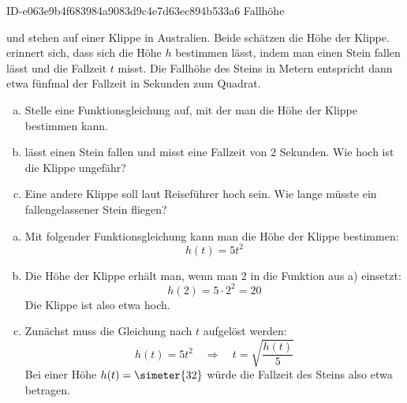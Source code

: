 \begin{exercise}
      {ID-e063e9b4f683984a9083d9c4e7d63ec894b533a6}
      {Fallhöhe}
  \ifproblem\problem\par
    \xya{} und \xyb{} stehen auf einer Klippe in Australien. Beide schätzen
    die Höhe der Klippe. \xya{} erinnert sich, dass sich die Höhe $h$ bestimmen
    lässt, indem man einen Stein fallen lässt und die Fallzeit $t$ misst. Die
    Fallhöhe des Steins in Metern entspricht dann etwa fünfmal der Fallzeit in
    Sekunden zum Quadrat.
    \begin{enumerate}[a)]
      \item Stelle eine Funktionsgleichung auf, mit der man die Höhe der Klippe
            bestimmen kann.
      \item \xya{} lässt einen Stein fallen und \xyb{} misst eine Fallzeit
            von \num{2} Sekunden. Wie hoch ist die Klippe ungefähr?
      \item Eine andere Klippe soll laut Reiseführer  hoch sein.
            Wie lange müsste ein fallengelassener Stein fliegen?
    \end{enumerate}
  \fi
  \ifoutcome\outcome\par
    \begin{enumerate}[a)]
      \item Mit folgender Funktionsgleichung kann man die Höhe der Klippe
            bestimmen:
            \begin{equation*}
              h(t)=5t^2
            \end{equation*}
      \item Die Höhe der Klippe erhält man, wenn man \num{2} in die Funktion aus a)
            einsetzt:
            \begin{equation*}
              h(\num{2})=5\cdot\num{2}^2=\num{20}
            \end{equation*}
            Die Klippe ist also etwa  hoch.
      \item Zunächst muss die Gleichung nach $t$ aufgelöst werden:
            \begin{equation*}
              h(t)=5t^2\quad\Rightarrow\quad t=\sqrt{\frac{h(t)}{5}}
            \end{equation*}
            Bei einer Höhe $h(t)=\simeter{32}$ würde die Fallzeit
            des Steins also etwa  betragen.
    \end{enumerate}
  \fi
\end{exercise}
